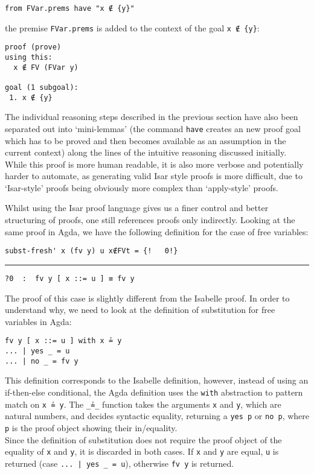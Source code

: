 \documentclass[a4paper, 12pt, twoside]{style/ociamthesis}
\theoremstyle{plain}
\theoremstyle{definition}
\theoremstyle{remark}
\begin{document}
\begin{verbatim}
from FVar.prems have "x ∉ {y}"
\end{verbatim}

the premise \texttt{FVar.prems} is added to the context of the goal
\texttt{x ∉ \{y\}}:

\begin{verbatim}
proof (prove)
using this:
  x ∉ FV (FVar y)

goal (1 subgoal):
 1. x ∉ {y}
\end{verbatim}

The individual reasoning steps described in the previous section have
also been separated out into `mini-lemmas' (the command \texttt{have}
creates an new proof goal which has to be proved and then becomes
available as an assumption in the current context) along the lines of
the intuitive reasoning discussed initially. While this proof is more
human readable, it is also more verbose and potentially harder to
automate, as generating valid Isar style proofs is more difficult, due
to `Isar-style' proofs being obviously more complex than `apply-style'
proofs.

Whilst using the Isar proof language gives us a finer control and better
structuring of proofs, one still references proofs only indirectly.
Looking at the same proof in Agda, we have the following definition for
the case of free variables:

\begin{verbatim}
subst-fresh' x (fv y) u x∉FVt = {!   0!}
\end{verbatim}

\noindent\rule{8cm}{0.4pt}

\begin{verbatim}
?0  :  fv y [ x ::= u ] ≡ fv y
\end{verbatim}

The proof of this case is slightly different from the Isabelle proof. In
order to understand why, we need to look at the definition of
substitution for free variables in Agda:

\begin{verbatim}
fv y [ x ::= u ] with x ≟ y
... | yes _ = u
... | no _ = fv y
\end{verbatim}

This definition corresponds to the Isabelle definition, however, instead
of using an if-then-else conditional, the Agda definition uses the
\texttt{with} abstraction to pattern match on \texttt{x ≟ y}. The
\texttt{\_≟\_} function takes the arguments \texttt{x} and \texttt{y},
which are natural numbers, and decides syntactic equality, returning a
\texttt{yes p} or \texttt{no p}, where \texttt{p} is the proof object
showing their in/equality.\\
Since the definition of substitution does not require the proof object
of the equality of \texttt{x} and \texttt{y}, it is discarded in both
cases. If \texttt{x} and \texttt{y} are equal, \texttt{u} is returned
(case \texttt{... | yes \_ = u}), otherwise \texttt{fv y} is returned.
\end{document}
